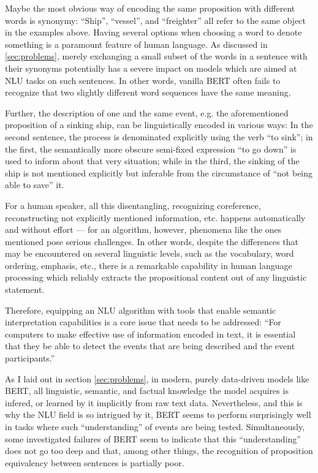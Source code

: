 Maybe the most obvious way of encoding the same proposition with different words is synonymy:
``Ship'', ``vessel'', and ``freighter'' all refer to the same object in the examples above. Having
several options when choosing a word to denote something is a paramount feature of human language.
As discussed in \ref{sec:problems}, merely exchanging a small subset of the words in a sentence
with their synonyms potentially has a severe impact on models which are aimed at NLU tasks on such
sentences. In other words, vanilla BERT often fails to recognize that two slightly different word
sequences have the same meaning.

Further, the description of one and the same event, e.g. the aforementioned proposition of a
sinking ship, can be linguistically encoded in various ways: In the second sentence, the process
is denominated explicitly using the verb ``to sink''; in the first, the semantically more obscure
semi-fixed expression ``to go down'' is used to inform about that very situation; while in the
third, the sinking of the ship is not mentioned explicitly but inferable from the circumstance of
``not being able to save'' it.

For a human speaker, all this disentangling, recognizing coreference, reconstructing not
explicitly mentioned information, etc. happens automatically and without effort --- for an
algorithm, however, phenomena like the ones mentioned pose serious challenges. In other
words, despite the differences that may be encountered on several linguistic levels, such
as the vocabulary, word ordering, emphasis, etc., there is a remarkable capability in human
language processing which reliably extracts the propositional content out of any linguistic
statement.

Therefore, equipping an NLU algorithm with tools that enable semantic interpretation capabilities
is a core issue that needs to be addressed: ``For computers to make effective use of information
encoded in text, it is essential that they be able to detect the events that are being described
and the event participants.'' \citep{palmer2010semantic}

As I laid out in section \ref{sec:problems}, in modern, purely data-driven models like BERT,
all linguistic, semantic, and factual knowledge the model acquires is infered, or learned by it
implicitly from raw text data. Nevertheless, and this is why the NLU field is so intrigued by
it, BERT seems to perform surprisingly well in tasks where such ``understanding'' of events are
being tested.
Simultaneously, some investigated failures of BERT seem to indicate that this ``understanding''
does not go too deep and that, among other things, the recognition of proposition equivalency
between sentences is partially poor.

